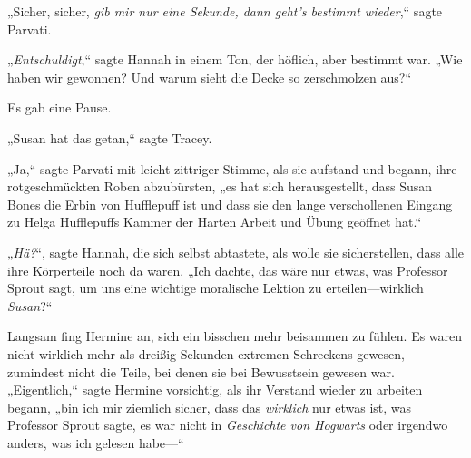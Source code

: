 „Sicher, sicher, \emph{gib mir nur eine Sekunde, dann geht’s bestimmt wieder},“ sagte Parvati.

„\emph{Entschuldigt},“ sagte Hannah in einem Ton, der höflich, aber bestimmt war. „Wie haben wir gewonnen? Und warum sieht die Decke so zerschmolzen aus?“

Es gab eine Pause.

„Susan hat das getan,“ sagte Tracey.

„Ja,“ sagte Parvati mit leicht zittriger Stimme, als sie aufstand und begann, ihre rotgeschmückten Roben abzubürsten, „es hat sich herausgestellt, dass Susan Bones die Erbin von Hufflepuff ist und dass sie den lange verschollenen Eingang zu Helga Hufflepuffs Kammer der Harten Arbeit und Übung geöffnet hat.“

„\emph{Hä?}“, sagte Hannah, die sich selbst abtastete, als wolle sie sicherstellen, dass alle ihre Körperteile noch da waren. „Ich dachte, das wäre nur etwas, was Professor Sprout sagt, um uns eine wichtige moralische Lektion zu erteilen—wirklich \emph{Susan}?“

Langsam fing Hermine an, sich ein bisschen mehr beisammen zu fühlen. Es waren nicht wirklich mehr als dreißig Sekunden extremen Schreckens gewesen, zumindest nicht die Teile, bei denen sie bei Bewusstsein gewesen war. „Eigentlich,“ sagte Hermine vorsichtig, als ihr Verstand wieder zu arbeiten begann, „bin ich mir ziemlich sicher, dass das \emph{wirklich} nur etwas ist, was Professor Sprout sagte, es war nicht in \emph{Geschichte von Hogwarts} oder irgendwo anders, was ich gelesen habe—“

